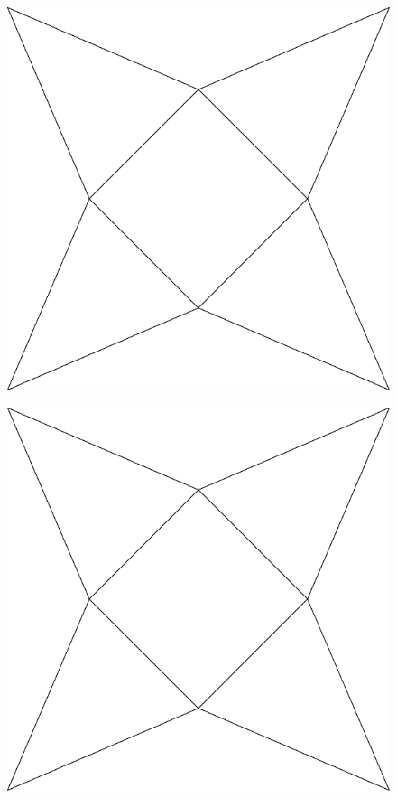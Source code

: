 


	\thispagestyle{empty}
\begin{figure}[H]
	\centering
	\includegraphics[]{pyr}
\end{figure} \vspace{10pt}
\begin{figure}[H]
	\centering
	\includegraphics[]{pyr}
\end{figure}


